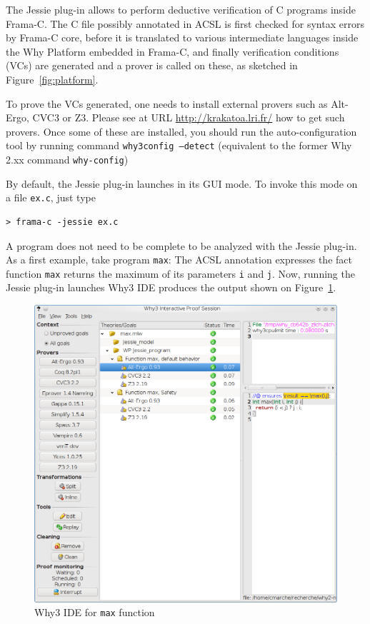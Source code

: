 \documentclass[a4paper,11pt,twoside,openright]{report}
\begin{document}
The Jessie plug-in allows to perform deductive verification of C
programs inside Frama-C. The C file possibly annotated in ACSL is
first checked for syntax errors by Frama-C core, before it is
translated to various intermediate languages inside the Why Platform
embedded in Frama-C, and finally verification conditions (VCs) are
generated and a prover is called on these, as sketched in
Figure~\ref{fig:platform}.

To prove the VCs generated, one needs to install external provers such
as Alt-Ergo, CVC3 or Z3. Please see at URL
\url{http://krakatoa.lri.fr/} how to get such provers. Once some of
these are installed, you should run the auto-configuration tool by
running command \texttt{why3config --detect} (equivalent to the
former Why 2.xx  command \texttt{why-config})

By default, the Jessie plug-in launches in its GUI mode. To invoke this
mode on a file \verb|ex.c|, just type

\begin{verbatim}
> frama-c -jessie ex.c
\end{verbatim}

A program does not need to be complete to be analyzed with the Jessie
plug-in. As a first example, take program \verb|max|:
 The ACSL annotation expresses the fact function
\verb|max| returns the maximum of its parameters \verb|i| and
\verb|j|. Now, running the Jessie plug-in launches Why3 IDE produces
the output shown on Figure~\ref{fig:max:ide}.

\begin{figure}[t]
  \begin{center}
    \includegraphics[width=\linewidth]{jessie/max_why3ide.png}
  \end{center}
  \caption{Why3 IDE for \texttt{max} function}
  \label{fig:max:ide}
\end{figure}
\end{document}
